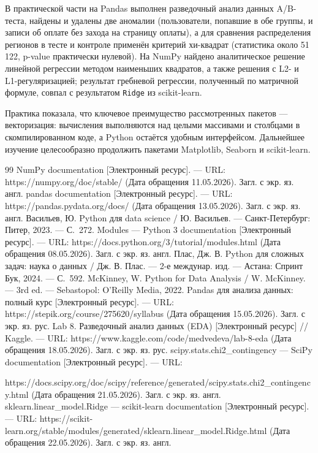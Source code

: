\documentclass[pract]{SCWorks}
\begin{document}
В практической части на Pandas выполнен разведочный анализ данных A/B-теста, найдены и удалены две аномалии
(пользователи, попавшие в обе группы, и записи об оплате без захода на страницу оплаты), а для сравнения
распределения регионов в тесте и контроле применён критерий хи-квадрат (статистика около 51\,122, p-value
практически нулевой). На NumPy найдено аналитическое решение линейной регрессии методом наименьших квадратов,
а также решения с L2- и L1-регуляризацией; результат гребневой регрессии, полученный по матричной формуле,
совпал с результатом \texttt{Ridge} из scikit-learn.

Практика показала, что ключевое преимущество рассмотренных пакетов --- векторизация: вычисления выполняются
над целыми массивами и столбцами в скомпилированном коде, а Python остаётся удобным интерфейсом. Дальнейшее
изучение целесообразно продолжить пакетами Matplotlib, Seaborn и scikit-learn.

\begin{thebibliography}{99}
 NumPy documentation [Электронный ресурс]. --- URL: https://numpy.org/doc/stable/ (Дата обращения 11.05.2026). Загл. с экр. яз. англ.
 pandas documentation [Электронный ресурс]. --- URL: https://pandas.pydata.org/docs/ (Дата обращения 13.05.2026). Загл. с экр. яз. англ.
 Васильев, Ю. Python для data science / Ю. Васильев. --- Санкт-Петербург: Питер, 2023. --- С.~272.
 Modules --- Python 3 documentation [Электронный ресурс]. --- URL: https://docs.python.org/3/tutorial/modules.html (Дата обращения 08.05.2026). Загл. с экр. яз. англ.
 Плас, Дж. В. Python для сложных задач: наука о данных / Дж. В. Плас. --- 2-е междунар. изд. --- Астана: Спринт Бук, 2024. --- С.~592.
 McKinney, W. Python for Data Analysis / W. McKinney. --- 3rd ed. --- Sebastopol: O'Reilly Media, 2022.
 Pandas для анализа данных: полный курс [Электронный ресурс]. --- URL: https://stepik.org/course/275620/syllabus (Дата обращения 15.05.2026). Загл. с экр. яз. рус.
 Lab 8. Разведочный анализ данных (EDA) [Электронный ресурс] // Kaggle. --- URL: https://www.kaggle.com/code/medvedeva/lab-8-eda (Дата обращения 18.05.2026). Загл. с экр. яз. рус.
 scipy.stats.chi2\_contingency --- SciPy documentation [Электронный ресурс]. --- URL: 

https://docs.scipy.org/doc/scipy/reference/generated/scipy.stats.chi2\_contingency.html (Дата обращения 21.05.2026). Загл. с экр. яз. англ.
 sklearn.linear\_model.Ridge --- scikit-learn documentation [Электронный ресурс]. --- URL: https://scikit-learn.org/stable/modules/generated/sklearn.linear\_model.Ridge.html (Дата обращения 22.05.2026). Загл. с экр. яз. англ.
\end{thebibliography}

\appendix
\end{document}

